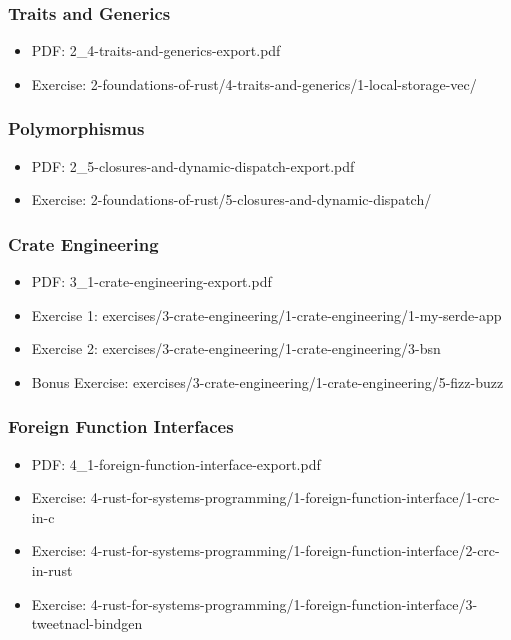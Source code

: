 \documentclass[utf8,aspectratio=169]{beamer}
\begin{document}
\begin{frame}
	\frametitle{Traits and Generics}
	\begin{itemize}
		\item PDF: 2\_4-traits-and-generics-export.pdf
		\item Exercise: 2-foundations-of-rust/4-traits-and-generics/1-local-storage-vec/
	\end{itemize}
\end{frame}

\begin{frame}
	\frametitle{Polymorphismus}
	\begin{itemize}
		\item PDF: 2\_5-closures-and-dynamic-dispatch-export.pdf
		\item Exercise: 2-foundations-of-rust/5-closures-and-dynamic-dispatch/
	\end{itemize}
\end{frame}

\begin{frame}
	\frametitle{Crate Engineering}
	\begin{itemize}
		\item PDF: 3\_1-crate-engineering-export.pdf
		\item Exercise 1: exercises/3-crate-engineering/1-crate-engineering/1-my-serde-app
		\item Exercise 2: exercises/3-crate-engineering/1-crate-engineering/3-bsn
		\item Bonus Exercise: exercises/3-crate-engineering/1-crate-engineering/5-fizz-buzz
	\end{itemize}
\end{frame}

\begin{frame}
	\frametitle{Foreign Function Interfaces}
	\begin{itemize}
		\item PDF: 4\_1-foreign-function-interface-export.pdf
		\item Exercise: 4-rust-for-systems-programming/1-foreign-function-interface/1-crc-in-c
		\item Exercise: 4-rust-for-systems-programming/1-foreign-function-interface/2-crc-in-rust
		\item Exercise: 4-rust-for-systems-programming/1-foreign-function-interface/3-tweetnacl-bindgen
	\end{itemize}
\end{frame}
\end{document}
